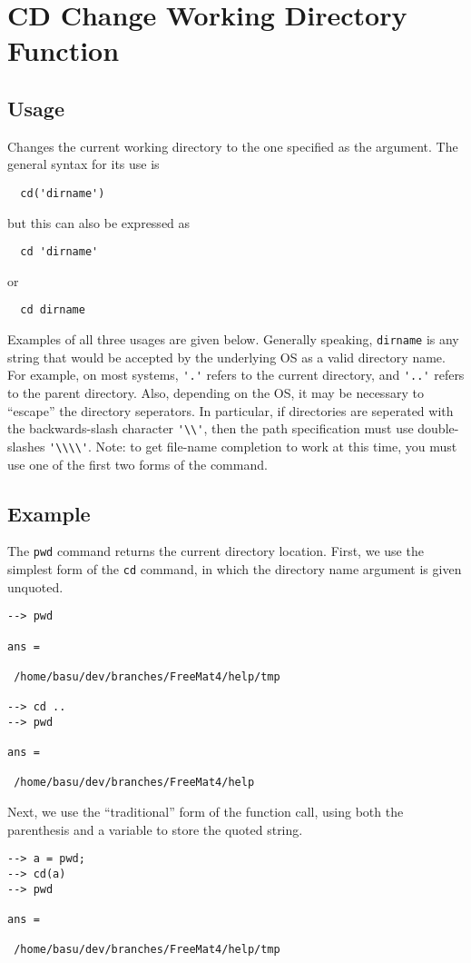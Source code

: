 \section{CD Change Working Directory Function}

\subsection{Usage}

Changes the current working directory to the one specified as the argument.  The general syntax for its use is
\begin{verbatim}
  cd('dirname')
\end{verbatim}
but this can also be expressed as
\begin{verbatim}
  cd 'dirname'
\end{verbatim}
or 
\begin{verbatim}
  cd dirname
\end{verbatim}
Examples of all three usages are given below.
Generally speaking, \verb|dirname| is any string that would be accepted 
by the underlying OS as a valid directory name.  For example, on most 
systems, \verb|'.'| refers to the current directory, and \verb|'..'| refers 
to the parent directory.  Also, depending on the OS, it may be necessary 
to ``escape'' the directory seperators.  In particular, if directories 
are seperated with the backwards-slash character \verb|'\\'|, then the 
path specification must use double-slashes \verb|'\\\\'|. Note: to get 
file-name completion to work at this time, you must use one of the 
first two forms of the command.

\subsection{Example}

The \verb|pwd| command returns the current directory location.  First, 
we use the simplest form of the \verb|cd| command, in which the directory 
name argument is given unquoted.
\begin{verbatim}
--> pwd

ans = 

 /home/basu/dev/branches/FreeMat4/help/tmp

--> cd ..
--> pwd

ans = 

 /home/basu/dev/branches/FreeMat4/help
\end{verbatim}
Next, we use the ``traditional'' form of the function call, using 
both the parenthesis and a variable to store the quoted string.
\begin{verbatim}
--> a = pwd;
--> cd(a)
--> pwd

ans = 

 /home/basu/dev/branches/FreeMat4/help/tmp
\end{verbatim}
